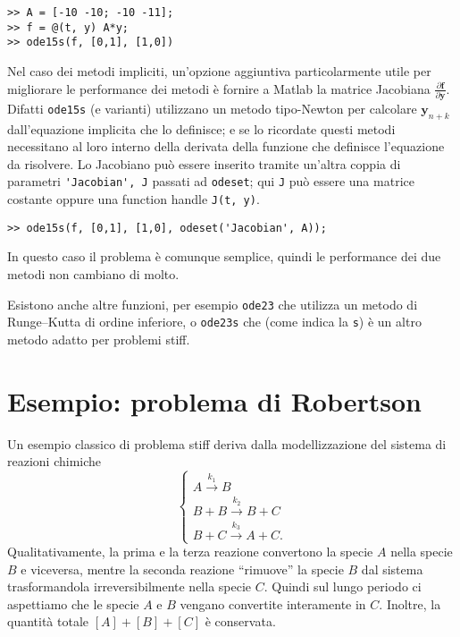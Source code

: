 \documentclass[a4paper]{report}
\theoremstyle{definiton}
\theoremstyle{remark}
\newcommand{\y}{\mathbf{y}}
\newcommand{\f}{\mathbf{f}}
\begin{document}
\begin{lstlisting}
>> A = [-10 -10; -10 -11];
>> f = @(t, y) A*y;
>> ode15s(f, [0,1], [1,0])
\end{lstlisting}

Nel caso dei metodi impliciti, un'opzione aggiuntiva particolarmente utile per migliorare le performance dei metodi è fornire a Matlab la matrice Jacobiana $\frac{\partial \f}{\partial \y}$. Difatti \lstinline{ode15s} (e varianti) utilizzano un metodo tipo-Newton per calcolare $\y_{n+k}$ dall'equazione implicita che lo definisce; e se lo ricordate questi metodi necessitano al loro interno della derivata della funzione che definisce l'equazione da risolvere. Lo Jacobiano può essere inserito tramite un'altra coppia di parametri \lstinline{'Jacobian', J} passati ad \lstinline{odeset}; qui \lstinline{J} può essere una matrice costante oppure una function handle \lstinline{J(t, y)}.

\begin{lstlisting}
>> ode15s(f, [0,1], [1,0], odeset('Jacobian', A));
\end{lstlisting}

In questo caso il problema è comunque semplice, quindi le performance dei due metodi non cambiano di molto.

Esistono anche altre funzioni, per esempio \lstinline{ode23} che utilizza un metodo di Runge--Kutta di ordine inferiore, o \lstinline{ode23s} che (come indica la \lstinline{s}) è un altro metodo adatto per problemi stiff.
\section{Esempio: problema di Robertson}


Un esempio classico di problema stiff deriva dalla modellizzazione del sistema di reazioni chimiche
\[
\begin{cases}
    A \stackrel{k_1}{\to} B\\
    B + B \stackrel{k_2}{\to} B+C\\
    B + C \stackrel{k_3}{\to} A + C.
\end{cases}
\]
Qualitativamente, la prima e la terza reazione convertono la specie $A$ nella specie $B$ e viceversa, mentre la seconda reazione ``rimuove'' la specie $B$ dal sistema trasformandola irreversibilmente nella specie $C$. Quindi sul lungo periodo ci aspettiamo che le specie $A$ e $B$ vengano convertite interamente in $C$. Inoltre, la quantità totale $[A] + [B] + [C]$ è conservata.
\end{document}
